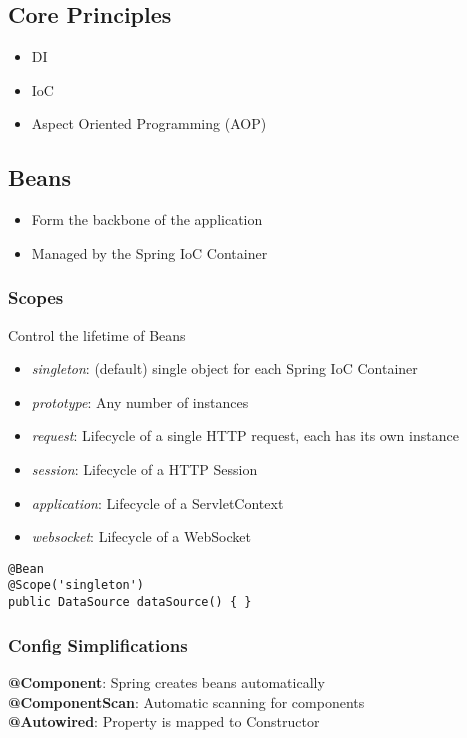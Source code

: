 \subsection{Core Principles}
\begin{itemize}
    \item DI
    \item IoC
    \item Aspect Oriented Programming (AOP)
\end{itemize}

\subsection{Beans}
\begin{itemize}
    \item Form the backbone of the application
    \item Managed by the Spring IoC Container
\end{itemize}
\subsubsection{Scopes}
Control the lifetime of Beans
\begin{itemize}
    \item \textit{singleton}: (default) single object for each Spring IoC Container
    \item \textit{prototype}: Any number of instances
    \item \textit{request}: Lifecycle of a single HTTP request, each has its own instance
    \item \textit{session}: Lifecycle of a HTTP Session
    \item \textit{application}: Lifecycle of a ServletContext
    \item \textit{websocket}: Lifecycle of a WebSocket
\end{itemize}
\begin{lstlisting}
@Bean
@Scope('singleton')
public DataSource dataSource() { }
\end{lstlisting}

\subsubsection{Config Simplifications}
\textbf{@Component}: Spring creates beans automatically\\
\textbf{@ComponentScan}: Automatic scanning for components\\
\textbf{@Autowired}: Property is mapped to Constructor

